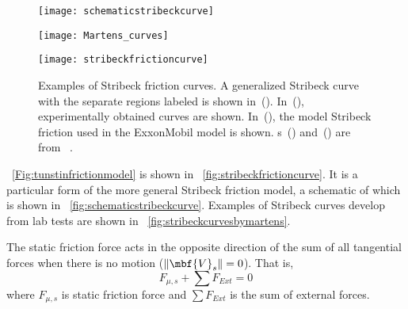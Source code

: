 \begin{figure}
	\begin{minipage}[t]{\linewidth}
		\begin{minipage}[t]{0.32\linewidth}
			\centering
			\texttt{[image: schematicstribeckcurve]}
			\label{fig:schematicstribeckcurve}
		\end{minipage}
		\hfill
		\begin{minipage}[t]{0.32\linewidth}
			\centering
			\texttt{[image: Martens\_curves]}
			\label{fig:stribeckcurvesbymartens}
		\end{minipage}
		\hfill
		\begin{minipage}[t]{0.32\linewidth}
			\centering
			\texttt{[image: stribeckfrictioncurve]}
            \label{fig:stribeckfrictioncurve}
		\end{minipage}
	\end{minipage}
	\caption[Examples of Stribeck friction curves]{Examples of Stribeck friction curves.  A generalized Stribeck curve with the separate regions labeled is shown in~().  In~(), experimentally obtained curves are shown.  In~(), the model Stribeck friction used in the ExxonMobil model is shown.  \figurename{}s~() and~() are from ~\cite{ref:martens2023a}.}
	\label{fig:stribeckfrictioncurveexamples}
\end{figure}
\equationname~\ref{Fig:tunstinfrictionmodel} is shown in \figurename~\ref{fig:stribeckfrictioncurve}.  It is a particular form of the more general Stribeck friction model, a schematic of which is shown in \figurename~\ref{fig:schematicstribeckcurve}.  Examples of Stribeck curves develop from lab tests are shown in \figurename~\ref{fig:stribeckcurvesbymartens}.

The static friction force acts in the opposite direction of the sum of all tangential forces when there is no motion ($\|\mbf{V}_{s}\|=0$).  That is,
\begin{equation}\label{zero}
  F_{\mu,s} + \sum F_{Ext} = 0
\end{equation}
where $F_{\mu,s}$ is static friction force and $\sum F_{Ext}$ is the sum of external forces.

